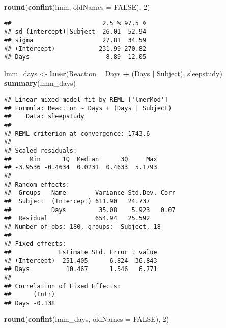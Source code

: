 \documentclass[]{article}
\newenvironment{Shaded}{\begin{snugshade}}{\end{snugshade}}
\newcommand{\DataTypeTok}[1]{\textcolor[rgb]{0.13,0.29,0.53}{#1}}
\newcommand{\DecValTok}[1]{\textcolor[rgb]{0.00,0.00,0.81}{#1}}
\newcommand{\KeywordTok}[1]{\textcolor[rgb]{0.13,0.29,0.53}{\textbf{#1}}}
\newcommand{\NormalTok}[1]{#1}
\newcommand{\OperatorTok}[1]{\textcolor[rgb]{0.81,0.36,0.00}{\textbf{#1}}}
\newcommand{\OtherTok}[1]{\textcolor[rgb]{0.56,0.35,0.01}{#1}}
\newcommand{\StringTok}[1]{\textcolor[rgb]{0.31,0.60,0.02}{#1}}
\begin{document}
\begin{Shaded}
\begin{Highlighting}[]
\KeywordTok{round}\NormalTok{(}\KeywordTok{confint}\NormalTok{(lmm, }\DataTypeTok{oldNames =} \OtherTok{FALSE}\NormalTok{), }\DecValTok{2}\NormalTok{)}
\end{Highlighting}
\end{Shaded}

\begin{verbatim}
##                         2.5 % 97.5 %
## sd_(Intercept)|Subject  26.01  52.94
## sigma                   27.81  34.59
## (Intercept)            231.99 270.82
## Days                     8.89  12.05
\end{verbatim}

\begin{Shaded}
\begin{Highlighting}[]
\NormalTok{lmm_days <-}\StringTok{ }\KeywordTok{lmer}\NormalTok{(Reaction }\OperatorTok{~}\StringTok{ }\NormalTok{Days }\OperatorTok{+}\StringTok{ }\NormalTok{(Days }\OperatorTok{|}\StringTok{ }\NormalTok{Subject), sleepstudy)}
\KeywordTok{summary}\NormalTok{(lmm_days)}
\end{Highlighting}
\end{Shaded}

\begin{verbatim}
## Linear mixed model fit by REML ['lmerMod']
## Formula: Reaction ~ Days + (Days | Subject)
##    Data: sleepstudy
## 
## REML criterion at convergence: 1743.6
## 
## Scaled residuals: 
##     Min      1Q  Median      3Q     Max 
## -3.9536 -0.4634  0.0231  0.4633  5.1793 
## 
## Random effects:
##  Groups   Name        Variance Std.Dev. Corr
##  Subject  (Intercept) 611.90   24.737       
##           Days         35.08    5.923   0.07
##  Residual             654.94   25.592       
## Number of obs: 180, groups:  Subject, 18
## 
## Fixed effects:
##             Estimate Std. Error t value
## (Intercept)  251.405      6.824  36.843
## Days          10.467      1.546   6.771
## 
## Correlation of Fixed Effects:
##      (Intr)
## Days -0.138
\end{verbatim}

\begin{Shaded}
\begin{Highlighting}[]
\KeywordTok{round}\NormalTok{(}\KeywordTok{confint}\NormalTok{(lmm_days, }\DataTypeTok{oldNames =} \OtherTok{FALSE}\NormalTok{), }\DecValTok{2}\NormalTok{)}
\end{Highlighting}
\end{Shaded}
\end{document}

